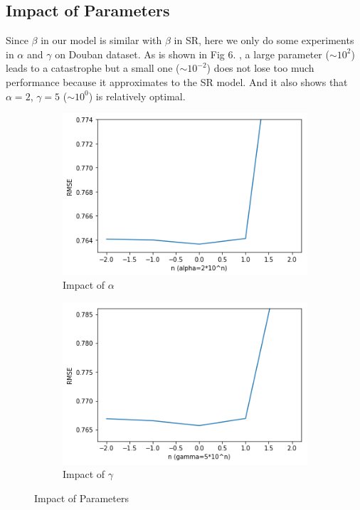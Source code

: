 \documentclass{article}
\begin{document}
\subsection{Impact of Parameters}
Since $\beta$ in our model is similar with $\beta$ in SR, here we 
only do some experiments in $\alpha$ and $\gamma$ on Douban dataset. 
As is shown in Fig 6. , a large parameter ($\sim 10^2$) 
leads to a catastrophe but a small one ($\sim 10^{-2}$) does not lose too much performance 
because it approximates to the SR model. 
And it also shows that $\alpha=2$, $\gamma=5$ ($\sim 10^{0}$) is relatively optimal.
\begin{figure}[h]    
  \centering
  \begin{subfigure}{0.4\textwidth}
    \centering
      \includegraphics[width=1\linewidth]{pic/figure6_1.png}
    \caption{Impact of $\alpha$}
  \end{subfigure}%
  \begin{subfigure}{0.4\textwidth}
  \centering
      \includegraphics[width=1\linewidth]{pic/figure6_2.png}
    \caption{Impact of $\gamma$}
  \end{subfigure}%
\caption{Impact of Parameters}
\end{figure}
\end{document}
